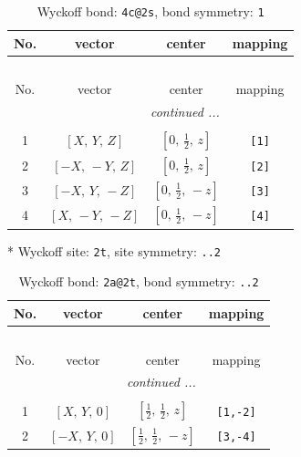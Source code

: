 \documentclass[fleqn,8pt]{jsarticle}
\begin{document}
\begin{longtable}{cccc}
\caption{Wyckoff bond: {\tt 4c@2s}, bond symmetry: {\tt 1}}
 \\
 \hline \hline
No. & vector & center & mapping \\ \hline \endfirsthead

\multicolumn{3}{l}{\tablename\ \thetable{}} \\
 \hline \hline
No. & vector & center & mapping \\ \hline \endhead

 \hline \hline
\multicolumn{3}{r}{\footnotesize\it continued ...} \\ \endfoot

 \hline \hline
\multicolumn{3}{r}{} \\ \endlastfoot

1 & $\left[ X,\, Y,\, Z \right]$ & $\left[ 0,\, \frac{1}{2},\, z \right]$ & {\tt [1]} \\ \hline
2 & $\left[ - X,\, - Y,\, Z \right]$ & $\left[ 0,\, \frac{1}{2},\, z \right]$ & {\tt [2]} \\ \hline
3 & $\left[ - X,\, Y,\, - Z \right]$ & $\left[ 0,\, \frac{1}{2},\, - z \right]$ & {\tt [3]} \\ \hline
4 & $\left[ X,\, - Y,\, - Z \right]$ & $\left[ 0,\, \frac{1}{2},\, - z \right]$ & {\tt [4]} \\
\end{longtable}
* Wyckoff site: {\tt 2t}, site symmetry: {\tt ..2}
\renewcommand{\arraystretch}{1.2}
\begin{longtable}{cccc}
\caption{Wyckoff bond: {\tt 2a@2t}, bond symmetry: {\tt ..2}}
 \\
 \hline \hline
No. & vector & center & mapping \\ \hline \endfirsthead

\multicolumn{3}{l}{\tablename\ \thetable{}} \\
 \hline \hline
No. & vector & center & mapping \\ \hline \endhead

 \hline \hline
\multicolumn{3}{r}{\footnotesize\it continued ...} \\ \endfoot

 \hline \hline
\multicolumn{3}{r}{} \\ \endlastfoot

1 & $\left[ X,\, Y,\, 0 \right]$ & $\left[ \frac{1}{2},\, \frac{1}{2},\, z \right]$ & {\tt [1,-2]} \\ \hline
2 & $\left[ - X,\, Y,\, 0 \right]$ & $\left[ \frac{1}{2},\, \frac{1}{2},\, - z \right]$ & {\tt [3,-4]} \\
\end{longtable}
\end{document}

